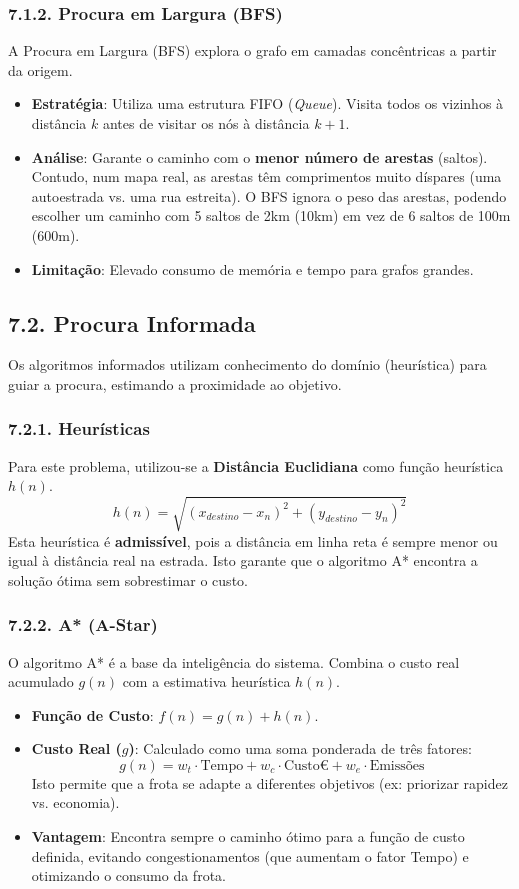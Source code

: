 \documentclass[a4paper]{article}
\begin{document}
\subsubsection*{7.1.2. Procura em Largura (BFS)}
\noindent A Procura em Largura (BFS) explora o grafo em camadas concêntricas a partir da origem.
\begin{itemize}
    \item \textbf{Estratégia}: Utiliza uma estrutura FIFO (\textit{Queue}). Visita todos os vizinhos à distância $k$ antes de visitar os nós à distância $k+1$.
    \item \textbf{Análise}: Garante o caminho com o \textbf{menor número de arestas} (saltos). Contudo, num mapa real, as arestas têm comprimentos muito díspares (uma autoestrada vs. uma rua estreita). O BFS ignora o peso das arestas, podendo escolher um caminho com 5 saltos de 2km (10km) em vez de 6 saltos de 100m (600m).
    \item \textbf{Limitação}: Elevado consumo de memória e tempo para grafos grandes.
\end{itemize}

\subsection*{7.2. Procura Informada}
\noindent Os algoritmos informados utilizam conhecimento do domínio (heurística) para guiar a procura, estimando a proximidade ao objetivo.

\subsubsection*{7.2.1. Heurísticas}
\noindent Para este problema, utilizou-se a \textbf{Distância Euclidiana} como função heurística $h(n)$.
\[ h(n) = \sqrt{(x_{destino} - x_n)^2 + (y_{destino} - y_n)^2} \]
\noindent Esta heurística é \textbf{admissível}, pois a distância em linha reta é sempre menor ou igual à distância real na estrada. Isto garante que o algoritmo A* encontra a solução ótima sem sobrestimar o custo.

\subsubsection*{7.2.2. A* (A-Star)}
\noindent O algoritmo A* é a base da inteligência do sistema. Combina o custo real acumulado $g(n)$ com a estimativa heurística $h(n)$.
\begin{itemize}
    \item \textbf{Função de Custo}: $f(n) = g(n) + h(n)$.
    \item \textbf{Custo Real ($g$)}: Calculado como uma soma ponderada de três fatores:
    \[ g(n) = w_t \cdot \text{Tempo} + w_c \cdot \text{Custo€} + w_e \cdot \text{Emissões} \]
    Isto permite que a frota se adapte a diferentes objetivos (ex: priorizar rapidez vs. economia).
    \item \textbf{Vantagem}: Encontra sempre o caminho ótimo para a função de custo definida, evitando congestionamentos (que aumentam o fator Tempo) e otimizando o consumo da frota.
\end{itemize}
\end{document}
